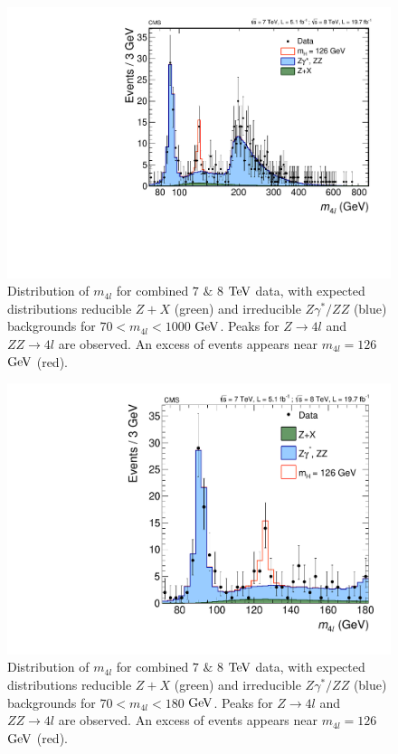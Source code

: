 \begin{figure}[htbp]
\begin{center}
\includegraphics[width=.7\linewidth]{HiggsDiscovery/figures/ZZMass_7Plus8TeV_70-1000_3GeV.pdf}
\caption[$m_{4l}$ Distributions of $4l$ Events]{Distribution of $m_{4l}$ for combined $7$  $\&$ $8$ $\rm{TeV}$ data, with expected distributions reducible $Z+X$ (green) and irreducible $Z\gamma^{*}/ZZ$ (blue) backgrounds for $70< m_{4l} < 1000$ $\rm{GeV}$. Peaks for $Z\rightarrow 4l$ and $ZZ\rightarrow 4l$ are observed. An excess of events appears near $m_{4l} = 126$ $\rm{GeV}$ (red).}
\label{fig:m4lPlot}
\end{center}
\end{figure}

\begin{figure}[htbp]
\begin{center}
\includegraphics[width=.7\linewidth]{HiggsDiscovery/figures/ZZMass_7Plus8TeV_70-180_3GeV.pdf}
\caption[$m_{4l}$ Distributions of $4l$ Events, $m_{4l}<180$ $\rm{GeV}$]{Distribution of $m_{4l}$ for combined $7$  $\&$ $8$ $\rm{TeV}$ data, with expected distributions reducible $Z+X$ (green) and irreducible $Z\gamma^{*}/ZZ$ (blue) backgrounds for $70< m_{4l} < 180$ $\rm{GeV}$. Peaks for $Z\rightarrow 4l$ and $ZZ\rightarrow 4l$ are observed. An excess of events appears near $m_{4l} = 126$ $\rm{GeV}$ (red).}
\label{fig:m4lPlotZoom}
\end{center}
\end{figure}

